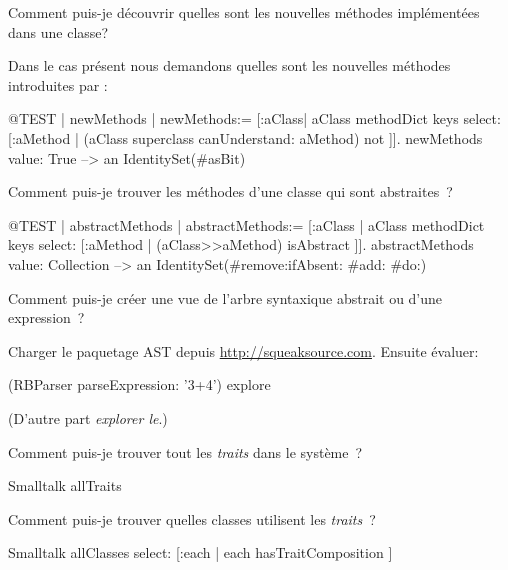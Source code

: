 \documentclass[a4paper,10pt,twoside]{book}
\begin{document}
\begin{faq}
Comment puis-je découvrir quelles sont les nouvelles méthodes implémentées dans une classe?
\end{faq}
\answer
Dans le cas présent nous demandons quelles sont les nouvelles méthodes introduites par :
\begin{code}{@TEST | newMethods |}
newMethods:= [:aClass| aClass methodDict keys select:
	[:aMethod | (aClass superclass canUnderstand: aMethod) not ]].
newMethods value: True --> an IdentitySet(#asBit)
\end{code}

\begin{faq}
Comment puis-je 
trouver
les méthodes d'une classe qui sont abstraites~?
\end{faq}
\answer
\begin{code}{@TEST | abstractMethods |}
abstractMethods:=
	[:aClass | aClass methodDict keys select:
		[:aMethod | (aClass>>aMethod) isAbstract ]].
abstractMethods value: Collection --> an IdentitySet(#remove:ifAbsent: #add: #do:)
\end{code}

\begin{faq}
Comment puis-je créer une vue de 
l'arbre syntaxique abstrait ou 
 d'une expression~?
\end{faq}
\answer
Charger le paquetage AST depuis \url{http://squeaksource.com}. Ensuite évaluer:
\begin{code}{}
(RBParser parseExpression: '3+4') explore
\end{code}
(D'autre part \emph{explorer le}.)

\begin{faq}
Comment puis-je trouver tout les \emph{traits} dans le système~?
\end{faq}
\answer
\begin{code}{}
Smalltalk allTraits
\end{code}

\begin{faq}
Comment puis-je trouver quelles classes utilisent les \emph{traits}~?
\end{faq}
\answer
\begin{code}{}
Smalltalk allClasses select: [:each | each hasTraitComposition ]
\end{code}
\end{document}
